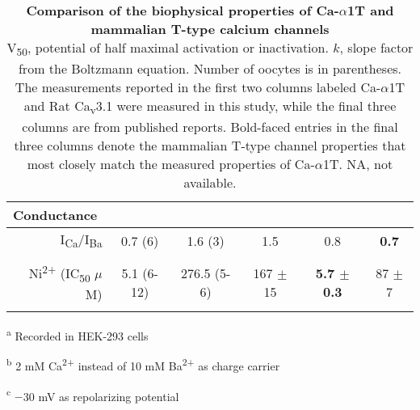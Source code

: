 {\begin{table}[ht!]
\begin{center}
\begin{threeparttable}
\begin{tabular}{@{}rccccc@{}}
\multicolumn{1}{l}{{\bf Conductance}} &  &  &  &  &  \\ \midrule \addlinespace
I\textsubscript{Ca}/I\textsubscript{Ba} & 0.7 (6) & 1.6 (3) & 1.5\cite{shcheglovitov:2007aa} & 0.8\cite{shcheglovitov:2007aa} & {\bf 0.7\cite{shcheglovitov:2007aa}} \\ \addlinespace \addlinespace
\multicolumn{1}{l}{{\bf Pharmacology}} &  &  &  &  &  \\ \midrule \addlinespace
Ni\textsuperscript{2+} (IC\textsubscript{50} $\mu$M) & 5.1 (6-12) & 276.5 (5-6) & 167 $\pm$ 15\cite{lee:1999ab}\tnote{c} & {\bf 5.7 $\pm$ 0.3\cite{lee:1999ab}\tnote{c}} & 87 $\pm$ 7\cite{lee:1999ab}\tnote{c} \\ \addlinespace 
\end{tabular}
    \begin{tablenotes}
        \begin{flushleft}
        \item[\textsuperscript{a}] Recorded in HEK-293 cells
        \item[\textsuperscript{b}] 2 mM Ca\textsuperscript{2+} instead of 10 mM Ba\textsuperscript{2+} as charge carrier
        \item[\textsuperscript{c}] $-$30 mV as repolarizing potential
        \end{flushleft}
    \end{tablenotes}
\end{threeparttable}
\end{center}
\caption{
{\bf Comparison of the biophysical properties of Ca-$\alpha$1T and mammalian T-type calcium channels}
\\
V\textsubscript{50}, potential of half maximal activation or inactivation.
$k$, slope factor from the Boltzmann equation.
Number of oocytes is in parentheses.
The measurements reported in the first two columns labeled Ca-$\alpha$1T and Rat Ca\textsubscript{v}3.1 were measured in this study, while the final three columns are from published reports.
Bold-faced entries in the final three columns denote the mammalian T-type channel properties that most closely match the measured properties of Ca-$\alpha$1T.
NA, not available.}
\label{tab:1}
\end{table}
}